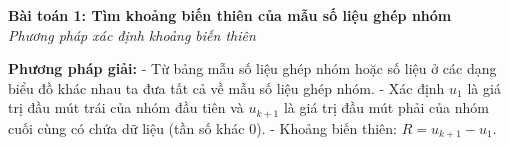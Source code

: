 \documentclass[12pt,a4paper]{article}
\newenvironment{lesson}[2]{
	\vspace{1em}\noindent\textbf{\Large #1}\\
	\textit{#2}\vspace{0.5em}
}{}
\begin{document}


\begin{lesson}{Bài toán 1: Tìm khoảng biến thiên của mẫu số liệu ghép nhóm}{Phương pháp xác định khoảng biến thiên}

\textbf{Phương pháp giải:}
- Từ bảng mẫu số liệu ghép nhóm hoặc số liệu ở các dạng biểu đồ khác nhau ta đưa tất cả về mẫu số liệu ghép nhóm.
- Xác định $u_1$ là giá trị đầu mút trái của nhóm đầu tiên và $u_{k+1}$ là giá trị đầu mút phải của nhóm cuối cùng có chứa dữ liệu (tần số khác $0$).
- Khoảng biến thiên: $R = u_{k+1} - u_1$.

\end{lesson}
\end{document}
